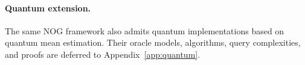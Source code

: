 \documentclass{article}
\def\gO{{\mathcal{O}}}
\theoremstyle{definition}
\theoremstyle{remark}
\begin{document}
\paragraph{Quantum extension.}
The same NOG framework also admits quantum implementations based on quantum
mean estimation.  Their oracle models, algorithms, query complexities, and
proofs are deferred to Appendix~\ref{app:quantum}.

\end{document}
